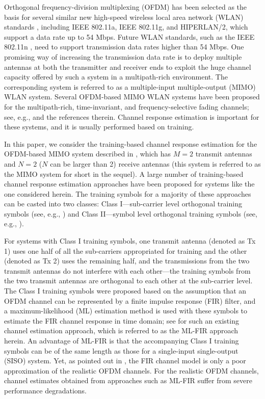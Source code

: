 \documentclass[11pt,draftnofoot,onecolumn]{IEEEtran}
\begin{document}
Orthogonal frequency-division multiplexing
(OFDM) has been selected as the basis for
several similar new high-speed
wireless local area network (WLAN) standards
\cite{NeeAwaterMorikura1999},
including IEEE 802.11a,
IEEE 802.11g, and HIPERLAN/2, which support a data rate
up to 54 Mbps.
Future WLAN standards, such as the IEEE 802.11n \cite{Coffey2003},
need to support transmission data rates higher than 54 Mbps.
One promising way of increasing the transmission data
rate is to deploy multiple antennas at both the transmitter and
receiver ends to exploit the
huge channel capacity offered by such a system in a multipath-rich
environment. %
The corresponding system is referred to as
a multiple-input multiple-output (MIMO) WLAN
system. Several OFDM-based
MIMO WLAN systems have been proposed for the multipath-rich,
time-invariant, and frequency-selective fading channels;
see, e.g., \cite{vanZelstSchenk2004,LiuLi2003c}
and the references therein.
Channel response estimation is important for these systems,
and it is usually performed based on training.

In this paper, we consider the training-based {channel response}
estimation for the OFDM-based MIMO system described in
\cite{LiuLi2003c}, which has $M = 2$ transmit antennas and $N = 2$
($N$ can be larger than 2) receive antennas (this system is referred
to as the MIMO system for short in the sequel). A large number of
training-based channel response estimation approaches have been
proposed for systems like the one considered herein. The training
symbols for a majority of these approaches can be casted into two
classes: Class I---sub-carrier level orthogonal training symbols
(see, e.g., \cite{LarssonLi2001,LiYe2002}) and Class II---symbol
level orthogonal training symbols (see, e.g.,
\cite{vanZelstSchenk2004,LiuLi2003c}).

For systems with Class I training symbols,
one transmit antenna (denoted as Tx 1) uses one half of all the sub-carriers
appropriated for training and the other (denoted as Tx 2) uses the remaining half,
and the transmissions from the two transmit antennas
do not interfere with each other---the training symbols from the
two transmit antennas are orthogonal
to each other at the sub-carrier level.
The Class I training symbols were proposed based on the assumption
that an OFDM channel
can be represented by a finite impulse response (FIR) filter,
and a maximum-likelihood (ML)
estimation method is used with these symbols
to estimate the FIR channel response in
time domain; see \cite{LarssonLi2001} for such an existing channel
estimation approach, which is referred to as the ML-FIR approach herein.
An advantage of ML-FIR is that the accompanying Class I training symbols
can be of the same length as those for a single-input single-output
(SISO) %
system. Yet, as pointed out in \cite{BeekEdforsSandell1995,LiuLi2004},
the FIR channel model is
only a poor approximation of the realistic OFDM channels.
For the realistic OFDM channels, channel estimates obtained from
approaches such as ML-FIR suffer from severe
performance degradations.
\end{document}
